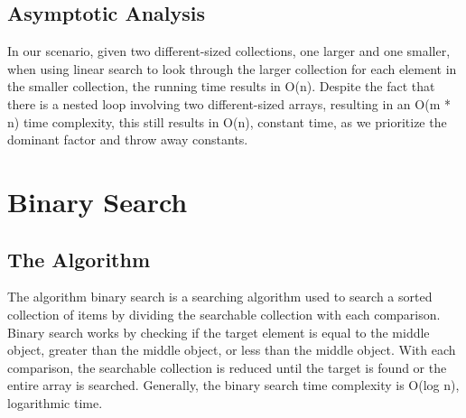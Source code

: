 \documentclass[letterpaper, 10pt,DIV=13]{scrartcl}
\numberwithin{equation}{section} %
\numberwithin{figure}{section} %
\numberwithin{table}{section} %
\begin{document}
\pagebreak

\subsection{Asymptotic Analysis}
In our scenario, given two different-sized collections, one larger and one smaller, when using linear search to look through the larger collection for each element in the smaller collection, the running time results in O(n). Despite the fact that there is a nested loop involving two different-sized arrays, resulting in an O(m * n) time complexity, this still results in O(n), constant time, as we prioritize the dominant factor and throw away constants.





\section{Binary Search}

\subsection{The Algorithm}
The algorithm binary search is a searching algorithm used to search a sorted collection of items by dividing the searchable collection with each comparison. Binary search works by checking if the target element is equal to the middle object, greater than the middle object, or less than the middle object. With each comparison, the searchable collection is reduced until the target is found or the entire array is searched. Generally, the binary search time complexity is O(log n), logarithmic time. 

\pagebreak
\end{document}
